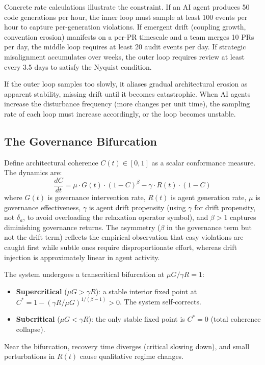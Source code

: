 Concrete rate calculations illustrate the constraint. If an AI agent produces 50 code generations per hour, the inner loop must sample at least 100 events per hour to capture per-generation violations. If emergent drift (coupling growth, convention erosion) manifests on a per-PR timescale and a team merges 10 PRs per day, the middle loop requires at least 20 audit events per day. If strategic misalignment accumulates over weeks, the outer loop requires review at least every 3.5 days to satisfy the Nyquist condition.

If the outer loop samples too slowly, it aliases gradual architectural erosion as apparent stability, missing drift until it becomes catastrophic. When AI agents increase the disturbance frequency (more changes per unit time), the sampling rate of each loop must increase accordingly, or the loop becomes unstable.

\subsection{The Governance Bifurcation}

Define architectural coherence $C(t) \in [0,1]$ as a scalar conformance measure. The dynamics are:
\begin{equation}
    \frac{dC}{dt} = \mu \cdot G(t) \cdot (1 - C)^\beta - \gamma \cdot R(t) \cdot (1 - C)
\end{equation}
where $G(t)$ is governance intervention rate, $R(t)$ is agent generation rate, $\mu$ is governance effectiveness, $\gamma$ is agent drift propensity (using $\gamma$ for drift propensity, not $\delta_a$, to avoid overloading the relaxation operator symbol), and $\beta > 1$ captures diminishing governance returns. The asymmetry ($\beta$ in the governance term but not the drift term) reflects the empirical observation that easy violations are caught first while subtle ones require disproportionate effort, whereas drift injection is approximately linear in agent activity.

\begin{theorem}
\label{thm:bifurcation}
The system undergoes a transcritical bifurcation at $\mu G / \gamma R = 1$:
\begin{itemize}
    \item \textbf{Supercritical} ($\mu G > \gamma R$): a stable interior fixed point at $C^* = 1 - (\gamma R / \mu G)^{1/(\beta-1)} > 0$. The system self-corrects.
    \item \textbf{Subcritical} ($\mu G < \gamma R$): the only stable fixed point is $C^* = 0$ (total coherence collapse).
\end{itemize}
Near the bifurcation, recovery time diverges (critical slowing down), and small perturbations in $R(t)$ cause qualitative regime changes.
\end{theorem}

